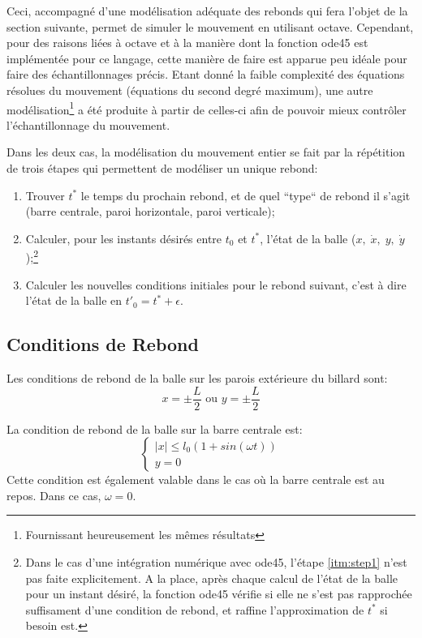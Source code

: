\documentclass[a4paper]{report}
\begin{document}
Ceci, accompagné d'une modélisation adéquate des rebonds qui fera l'objet de la section suivante, permet de simuler le mouvement en utilisant octave. Cependant, pour des raisons liées à octave et à la manière dont la fonction ode45 est implémentée pour ce langage, cette manière de faire est apparue peu idéale pour faire des échantillonnages précis. Etant donné la faible complexité des équations résolues du mouvement (équations du second degré maximum), une autre modélisation\footnote{Fournissant heureusement les mêmes résultats} a été produite à partir de celles-ci afin de pouvoir mieux contrôler l'échantillonnage du mouvement.

Dans les deux cas, la modélisation du mouvement entier se fait par la répétition de trois étapes qui permettent de modéliser un unique rebond:
\begin{enumerate}
 \item Trouver \(t^*\) le temps du prochain rebond, et de quel ``type`` de rebond il s'agit (barre centrale, paroi horizontale, paroi verticale)\label{itm:step1};
 \item Calculer, pour les instants désirés entre \(t_0\) et \(t^*\), l'état de la balle (\(x, \; \dot{x}, \; y, \; \dot{y} \));\footnote{Dans le cas d'une intégration numérique avec ode45, l'étape \ref{itm:step1} n'est pas faite explicitement. A la place, après chaque calcul de l'état de la balle pour un instant désiré, la fonction ode45 vérifie si elle ne s'est pas rapprochée suffisament d'une condition de rebond, et raffine l'approximation de \(t^*\) si besoin est.}
 \item Calculer les nouvelles conditions initiales pour le rebond suivant, c'est à dire l'état de la balle en \(t'_0=t^*+\epsilon\).
\end{enumerate}
\subsection{Conditions de Rebond}
Les conditions de rebond de la balle sur les parois extérieure du billard sont:
\begin{equation*}
 x=\pm \frac{L}{2} \text{ ou } y=\pm \frac{L}{2}
\end{equation*}

La condition de rebond de la balle sur la barre centrale est:
\begin{equation}
\label{eqn:rebCentr}
\begin{cases}
\lvert x \rvert \leq l_0(1+sin(\omega t))\\
y=0
\end{cases}
\end{equation}
Cette condition est également valable dans le cas où la barre centrale est au repos. Dans ce cas, \(\omega=0\).
\end{document}
